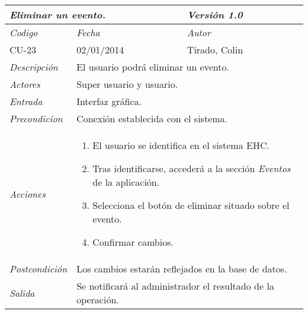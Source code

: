 \begin{center}
    \begin{tabular}{|p{3cm}|p{4cm}|p{4cm}|p{4cm}|}
    \hline \multicolumn{3}{|p{9cm}|}{\textit{Eliminar un evento.}} & \textit{Versi\'on 1.0} \\
	\hline \textit{Codigo} & \textit{Fecha} & \multicolumn{2}{|p{6cm}|}{\textit{Autor}} \\
	CU-23 & 02/01/2014 & \multicolumn{2}{|p{6cm}|}{Tirado, Colin} \\		
    \hline \textit{Descripci\'on} & \multicolumn{3}{|p{9cm}|}{El usuario podr\'a eliminar un evento.} \\
    \hline \textit{Actores} & \multicolumn{3}{|p{9cm}|}{Super usuario y usuario.} \\
    \hline \textit{Entrada} & \multicolumn{3}{|p{9cm}|}{Interfaz gr\'afica.} \\
    \hline \textit{Precondic\'ion} & \multicolumn{3}{|p{9cm}|}{Conexi\'on establecida con el sistema.} \\
    \hline \textit{Acciones} & \multicolumn{3}{|p{9cm}|}{
        \begin{enumerate}
        \item El usuario se identifica en el sistema EHC.
        \item Tras identificarse, acceder\'a a la secci\'on \textit{Eventos} de la aplicaci\'on.
        \item Selecciona el bot\'on de eliminar situado sobre el evento.
        \item Confirmar cambios.
        \end{enumerate}
           } \\
    \hline \textit{Postcondici\'on} & \multicolumn{3}{|p{9cm}|}{Los cambios estar\'an reflejados en la base de datos.} \\
    \hline \textit{Salida} & \multicolumn{3}{|p{9cm}|}{Se notificar\'a al administrador el resultado de la operaci\'on.} \\ \hline
    \end{tabular}
\end{center}
